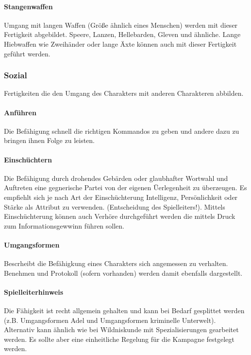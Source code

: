 \documentclass{article}
\begin{document}
\paragraph{Stangenwaffen}

Umgang mit langen Waffen (Größe ähnlich eines Menschen) werden mit dieser Fertigkeit abgebildet. Speere, Lanzen,
Hellebarden, Gleven und ähnliche. Lange Hiebwaffen wie Zweihänder oder lange Äxte können auch mit dieser Fertigkeit
geführt werden.

\subsubsection{Sozial}

Fertigkeiten die den Umgang des Charakters mit anderen Charakteren abbilden.

\paragraph{Anführen}

Die Befähigung schnell die richtigen Kommandos zu geben und andere dazu zu bringen ihnen Folge zu leisten.

\paragraph{Einschüchtern}

Die Befähigung durch drohendes Gebärden oder glaubhafter Wortwahl und Auftreten eine gegnerische Partei von der
eigenen Üerlegenheit zu überzeugen. Es empfiehlt sich je nach Art der Einschüchterung Intelligenz, Persönlichkeit
oder Stärke als Attribut zu verwenden. (Entscheidung des Spielleiters!). Mittels Einschüchterung können auch Verhöre
durchgeführt werden die mittels Druck zum Informationsgewwinn führen sollen.

\paragraph{Umgangsformen}

Bescrheibt die Befähigkung eines Charakters sich angemessen zu verhalten. Benehmen und Protokoll (sofern vorhanden)
werden damit ebenfalls dargestellt.

\begin{mdframed}[hidealllines=true, backgroundcolor=black!10]
\paragraph{Spielleiterhinweis}

Die Fähigkeit ist recht allgemein gehalten und kann bei Bedarf gesplittet werden (z.B. Umgangsformen Adel und
Umgangsformen kriminelle Unterwelt). Alternativ kann ähnlich wie bei Wildniskunde mit Spezialisierungen gearbeitet
werden. Es sollte aber eine einheitliche Regelung für die Kampagne festgelegt werden.

\end{mdframed}
\end{document}
